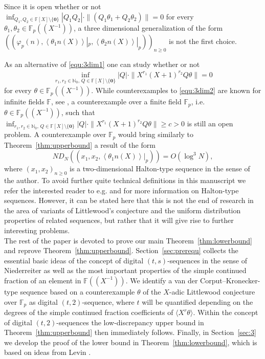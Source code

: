 \documentclass{article}
\newcommand{\NN}{\mathbb N}
\newcommand{\FF}{\mathbb{F}}
\renewcommand{\(}{\left (}
\renewcommand{\)}{\right )}
\theoremstyle{definition}
\numberwithin{equation}{section}
\begin{document}
Since it is open whether or not
$\inf_{Q_1,Q_2\in\FF[X]\setminus\{\boldsymbol{0}\}} |Q_1Q_2| \cdot\|(Q_1\theta_1+Q_2\theta_2)\|=0$
for every $\theta_1,\theta_2 \in\FF_p((X^{-1}))$, a three dimensional generalization of the form $((\varphi_p(n),{\left<  \theta_1 n(X)\right>}|_p,{\left<  \theta_2 n(X)\right>}|_p))_{n\geq 0}$ is not the first choice. 

As an alternative of \eqref{equ:3dim1} one can study whether or not
\begin{align}\label{equ:3dim2}\inf_{r_1,r_2\in\NN_0,\,Q\in\FF[X]\setminus\{\boldsymbol{0}\}} |Q| \cdot\|X^{r_1}(X+1)^{r_2}Q\theta\|=0\end{align}
for every $\theta\in\FF_p((X^{-1}))$. 
While counterexamples to \eqref{equ:3dim2} are known for infinite fields $\FF$, see \cite[Theorem~1]{BugMat2008}, a counterexample over a finite field $\FF_p$, i.e. $\theta\in\FF_p((X^{-1}))$, such that $\inf_{r_1,r_2\in\NN_0,\,Q\in\FF[X]\setminus\{\boldsymbol{0}\}} |Q| \cdot\|X^{r_1}(X+1)^{r_2}Q\theta\|\geq c>0$ is still an open problem. A counterexample over $\FF_p$ would bring similarly to Theorem~\ref{thm:upperbound} a result of the form 
$$ND_N((x_1,x_2,{\left<  \theta_1 n(X)\right>}|_p))=O(\log^3 N),$$
where $(x_1,x_2)_{n\geq 0}$ is a two-dimensional Halton-type sequence in the sense of the author. To avoid further quite technical definitions in this manuscript we refer the interested reader to  e.g. \cite{HoferdigKH} and \cite{Hofer} for more information on Halton-type sequences. However, it can be stated here that this is not the end of research in the area of variants of Littlewood's conjecture and the uniform distribution properties of related sequences, but rather that it will give rise to further interesting problems.\\



The rest of the paper is devoted to prove our main Theorem~\ref{thm:lowerbound} and reprove Theorem~\ref{thm:upperbound}. Section~\ref{sec:prerequ} collects the essential basic ideas of the concept of digital $(t,s)$-sequences in the sense of Niederreiter \cite{nie} as well as the most important properties of the simple continued fraction of an element in $\FF((X^{-1}))$. We identify a van der Corput--Kronecker-type sequence based on a counterexample $\theta$ of the $X$-adic Littlewood conjecture over $\FF_p$ as digital $(t,2)$-sequence, where $t$ will be quantified depending on the degrees of the simple continued fraction coefficients of $\langle X^r\theta\rangle$. Within the concept of digital $(t,2)$-sequences the low-discrepancy upper bound in Theorem~\ref{thm:upperbound} then immediately follows. Finally, in Section~\ref{sec:3} we develop the proof of the lower bound in Theorem~\ref{thm:lowerbound}, which is based on ideas from Levin \cite{Levints1}. %
\end{document}
